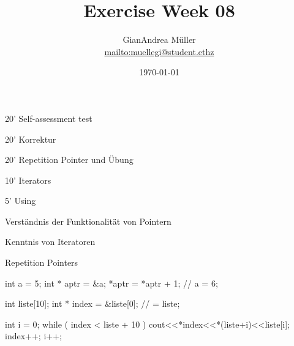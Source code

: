 \ifnum\conditionmacro=1 \documentclass[handout,usenames,dvipsnames]{beamer}\fi
\title{Exercise Week 08}
\author{GianAndrea Müller\\ \url{mailto:muellegi@student.ethz}}
\date{\today}
\begin{document}
\maketitle

\begin{TFTimeSchedule}
\item 20' Self-assessment test
\item 20' Korrektur
\item 20' Repetition Pointer und Übung
\item 10' Iterators
\item 5' Using
\end{TFTimeSchedule}

\begin{TFLearningObjectives}
\item Verständnis der Funktionalität von Pointern
\item Kenntnis von Iteratoren
\end{TFLearningObjectives}

\begin{frame}[fragile]{Repetition Pointers}
\begin{TFCpp}
int a = 5;
int * aptr = &a;
*aptr = *aptr + 1; // a = 6;

int liste[10];
int * index = &liste[0]; // = liste;

int i = 0;
while ( index < liste + 10 ){
	cout<<*index<<*(liste+i)<<liste[i];
	index++; i++;
}
\end{TFCpp}
\end{frame}

\end{document}
